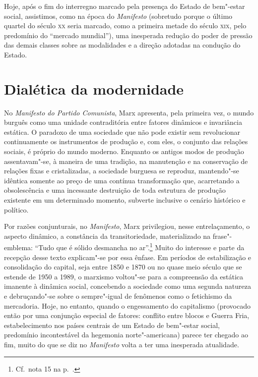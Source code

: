 Hoje, após o fim do interregno marcado pela presença do Estado de
bem"-estar social, assistimos, como na época do \textit{Manifesto
}(sobretudo porque o último quartel do século \textsc{xx} seria marcado, como a
primeira metade do século \textsc{xix}, pelo predomínio do “mercado mundial”),
uma inesperada redução do poder de pressão das demais classes sobre as
modalidades e a direção adotadas na condução do Estado.

\section*{Dialética da modernidade}

No \textit{Manifesto do Partido Comunista}, Marx apresenta,
pela primeira vez, o mundo burguês como uma unidade contraditória entre
fatores dinâmicos e invariância estática. O paradoxo de uma sociedade
que não pode existir sem revolucionar continuamente os instrumentos de
produção e, com eles, o conjunto das relações sociais, é próprio do
mundo moderno. Enquanto os antigos modos de produção assentavam"-se, à
maneira de uma tradição, na manutenção e na conservação de relações fixas
e cristalizadas, a sociedade burguesa se reproduz, mantendo"-se
idêntica somente ao preço de uma contínua transformação que,
acarretando a obsolescência e uma incessante destruição de toda
estrutura de produção existente em um determinado momento, subverte
inclusive o cenário histórico e político.

Por razões conjunturais, no \textit{Manifesto}, Marx privilegiou, nesse entrelaçamento, o aspecto dinâmico, a constância
da transitoriedade, materializado na frase"-emblema: “Tudo que é
sólido desmancha no ar”.\footnote{ Cf.~nota 15 na p.~\pageref{2}.} Muito do interesse e parte da recepção desse
texto explicam"-se por essa ênfase. Em períodos de estabilização e
consolidação do capital, seja entre 1850 e 1870 ou no quase meio século
que se estende de 1950 a 1989, o marxismo voltou"-se para a
compreensão da estática imanente à dinâmica social, concebendo a
sociedade como uma segunda natureza e debruçando"-se sobre o
sempre"-igual de fenômenos como o fetichismo da mercadoria. Hoje, no
entanto, quando o engessamento do capitalismo (provocado então por uma
conjunção especial de fatores: conflito entre blocos e Guerra Fria,
estabelecimento nos países centrais de um Estado de bem"-estar social,
predomínio incontestável da hegemonia norte"-americana) parece ter
chegado ao fim, muito do que se diz no \textit{Manifesto} volta a ter
uma inesperada atualidade.


